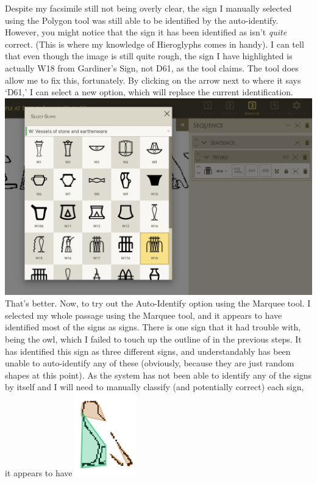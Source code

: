\documentclass{article}
\begin{document}
\break \noindent
Despite my facsimile still not being overly clear, the sign I manually selected using the Polygon tool was still able to be identified by the auto-identify.
\newline \break \noindent
However, you might notice that the sign it has been identified as isn't \textit{quite} correct. (This is where my knowledge of Hieroglyphs comes in handy). I can tell that even though the image is still quite rough, the sign I have highlighted is actually W18 from Gardiner's Sign, not D61, as the tool claims. The tool does allow me to fix this, fortunately. By clicking on the arrow next to where it says `D61,' I can select a new option, which will replace the current identification.
\newline \break
\includegraphics[width=1.0\textwidth]{hiero_13.PNG}
\break \noindent
That's better.
\newline \break \noindent
Now, to try out the Auto-Identify option using the Marquee tool. I selected my whole passage using the Marquee tool, and it appears to have identified most of the signs as signs. There is one sign that it had trouble with, being the owl, which I failed to touch up the outline of in the previous steps. It has identified this sign as three different signs, and understandably has been unable to auto-identify any of these (obviously, because they are just random shapes at this point). As the system has not been able to identify any of the signs by itself and I will need to manually classify (and potentially correct) each sign, it appears to have 
\newline \break
\includegraphics[width=0.2\textwidth]{hiero_14.PNG}
\end{document}
